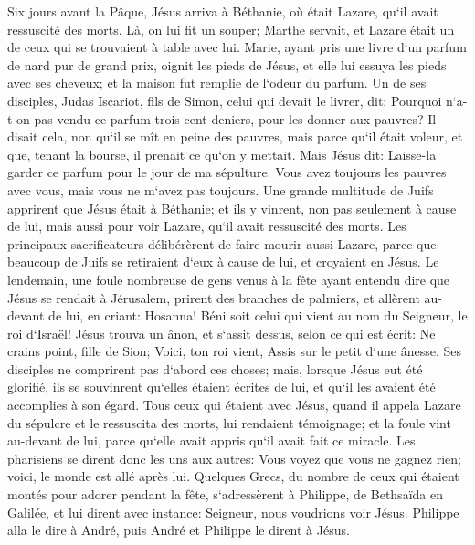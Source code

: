 \verse Six jours avant la Pâque, Jésus arriva à Béthanie, où était Lazare, qu`il avait ressuscité des morts. 
\verse Là, on lui fit un souper; Marthe servait, et Lazare était un de ceux qui se trouvaient à table avec lui. 
\verse Marie, ayant pris une livre d`un parfum de nard pur de grand prix, oignit les pieds de Jésus, et elle lui essuya les pieds avec ses cheveux; et la maison fut remplie de l`odeur du parfum. 
\verse Un de ses disciples, Judas Iscariot, fils de Simon, celui qui devait le livrer, dit: 
\verse Pourquoi n`a-t-on pas vendu ce parfum trois cent deniers, pour les donner aux pauvres? 
\verse Il disait cela, non qu`il se mît en peine des pauvres, mais parce qu`il était voleur, et que, tenant la bourse, il prenait ce qu`on y mettait. 
\verse Mais Jésus dit: Laisse-la garder ce parfum pour le jour de ma sépulture. 
\verse Vous avez toujours les pauvres avec vous, mais vous ne m`avez pas toujours. 
\verse Une grande multitude de Juifs apprirent que Jésus était à Béthanie; et ils y vinrent, non pas seulement à cause de lui, mais aussi pour voir Lazare, qu`il avait ressuscité des morts. 
\verse Les principaux sacrificateurs délibérèrent de faire mourir aussi Lazare, 
\verse parce que beaucoup de Juifs se retiraient d`eux à cause de lui, et croyaient en Jésus. 
\verse Le lendemain, une foule nombreuse de gens venus à la fête ayant entendu dire que Jésus se rendait à Jérusalem, 
\verse prirent des branches de palmiers, et allèrent au-devant de lui, en criant: Hosanna! Béni soit celui qui vient au nom du Seigneur, le roi d`Israël! 
\verse Jésus trouva un ânon, et s`assit dessus, selon ce qui est écrit: 
\verse Ne crains point, fille de Sion; Voici, ton roi vient, Assis sur le petit d`une ânesse. 
\verse Ses disciples ne comprirent pas d`abord ces choses; mais, lorsque Jésus eut été glorifié, ils se souvinrent qu`elles étaient écrites de lui, et qu`il les avaient été accomplies à son égard. 
\verse Tous ceux qui étaient avec Jésus, quand il appela Lazare du sépulcre et le ressuscita des morts, lui rendaient témoignage; 
\verse et la foule vint au-devant de lui, parce qu`elle avait appris qu`il avait fait ce miracle. 
\verse Les pharisiens se dirent donc les uns aux autres: Vous voyez que vous ne gagnez rien; voici, le monde est allé après lui. 
\verse Quelques Grecs, du nombre de ceux qui étaient montés pour adorer pendant la fête, 
\verse s`adressèrent à Philippe, de Bethsaïda en Galilée, et lui dirent avec instance: Seigneur, nous voudrions voir Jésus. 
\verse Philippe alla le dire à André, puis André et Philippe le dirent à Jésus. 
